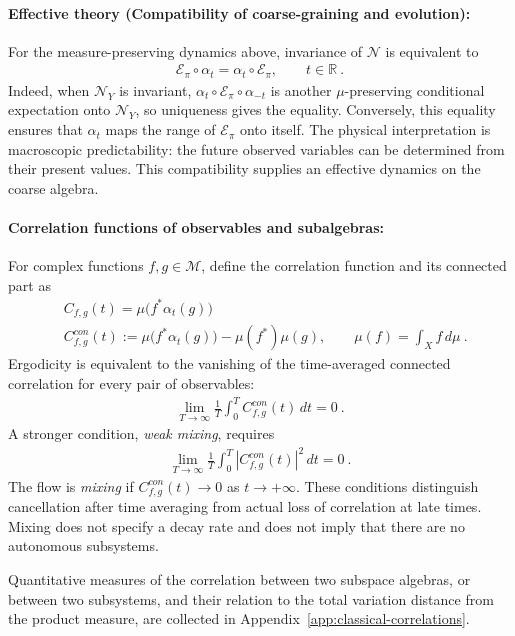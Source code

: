 \documentclass[a4paper,11pt]{article}
\theoremstyle{definition}
\newcommand{\nn}{\nonumber}
\newcommand{\mN}{\mathcal{N}}
\newcommand{\mM}{\mathcal{M}}
\newcommand{\mE}{\mathcal{E}}
\begin{document}
\paragraph{Effective theory (Compatibility of coarse-graining and evolution):}
For the measure-preserving dynamics above, invariance of $\mN$ is equivalent to
\begin{align}\label{eq:classical-expectation-equivariance}
    \mE_{\pi}\circ\alpha_t=\alpha_t\circ \mE_{\pi},
    \qquad t\in\mathbb R\ .
\end{align}
Indeed, when $\mN_Y$ is invariant, $\alpha_t\circ \mE_{\pi}\circ\alpha_{-t}$ is another $\mu$-preserving conditional expectation onto $\mN_Y$, so uniqueness gives the equality. Conversely, this equality ensures that $\alpha_t$ maps the range of $\mE_{\pi}$ onto itself. The physical interpretation is macroscopic predictability: the future observed variables can be determined from their present values. This compatibility supplies an effective dynamics on the coarse algebra.

\paragraph{Correlation functions of observables and subalgebras:}
For complex functions $f,g\in\mM$, define the correlation function and its connected part as
\begin{align}
    &C_{f,g}(t)=\mu\bigl(f^*\alpha_t(g)\bigr)\nn\\
    &C^{con}_{f,g}(t)
    :=\mu\bigl(f^*\alpha_t(g)\bigr)-\mu(f^*)\mu(g),
    \qquad \mu(f)=\int_X f\,d\mu\ .
\end{align}
Ergodicity is equivalent to the vanishing of the time-averaged connected correlation for every pair of observables:
\begin{align}
    \lim_{T\to\infty}\frac{1}{T}\int_0^T C^{con}_{f,g}(t)\,dt=0\ .
\end{align}
A stronger condition, {\it weak mixing}, requires
\begin{align}
    \lim_{T\to\infty}\frac{1}{T}\int_0^T |C^{con}_{f,g}(t)|^2\,dt=0\ .
\end{align}
The flow is {\it mixing} if $C^{con}_{f,g}(t)\to0$ as $t\to+\infty$. These conditions distinguish cancellation after time averaging from actual loss of correlation at late times. Mixing does not specify a decay rate and does not imply that there are no autonomous subsystems.

Quantitative measures of the correlation between two subspace algebras, or between two subsystems, and their relation to the total variation distance from the product measure, are collected in Appendix~\ref{app:classical-correlations}.
\end{document}
